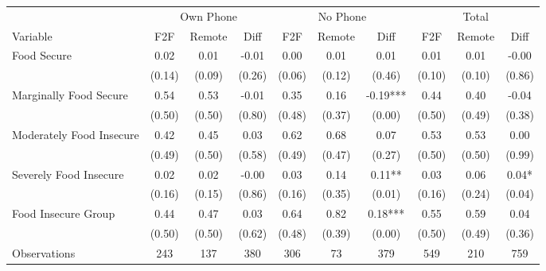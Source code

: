 \begin{tabular}{l*{9}c}
\hline\hline
 & \multicolumn{3}{c}{Own Phone} & \multicolumn{3}{c}{No Phone} & \multicolumn{3}{c}{Total}\\ 
Variable & F2F & Remote & Diff & F2F & Remote & Diff & F2F & Remote & Diff \\
\hline
Food Secure&0.02&0.01&-0.01&0.00&0.01&0.01&0.01&0.01&-0.00\\
&(0.14)&(0.09)&(0.26)&(0.06)&(0.12)&(0.46)&(0.10)&(0.10)&(0.86)\\
Marginally Food Secure&0.54&0.53&-0.01&0.35&0.16&-0.19***&0.44&0.40&-0.04\\
&(0.50)&(0.50)&(0.80)&(0.48)&(0.37)&(0.00)&(0.50)&(0.49)&(0.38)\\
Moderately Food Insecure&0.42&0.45&0.03&0.62&0.68&0.07&0.53&0.53&0.00\\
&(0.49)&(0.50)&(0.58)&(0.49)&(0.47)&(0.27)&(0.50)&(0.50)&(0.99)\\
Severely Food Insecure&0.02&0.02&-0.00&0.03&0.14&0.11**&0.03&0.06&0.04*\\
&(0.16)&(0.15)&(0.86)&(0.16)&(0.35)&(0.01)&(0.16)&(0.24)&(0.04)\\
Food Insecure Group&0.44&0.47&0.03&0.64&0.82&0.18***&0.55&0.59&0.04\\
&(0.50)&(0.50)&(0.62)&(0.48)&(0.39)&(0.00)&(0.50)&(0.49)&(0.36)\\
\hline
Observations & 243 & 137 & 380 & 306 & 73 & 379 & 549 & 210 & 759 \\
\hline\hline
\end{tabular}
